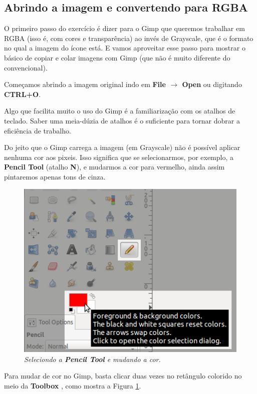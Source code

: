 \documentclass[12pt,onecolumn]{article}
\begin{document}
  \subsection{Abrindo a imagem e convertendo para RGBA}
    O primeiro passo do exercício é dizer para o Gimp que queremos trabalhar em
    RGBA (isso é, com cores e transparência) ao invés de Grayscale, que é o
    formato no qual a imagem do ícone está. E vamos aproveitar esse passo para
    mostrar o básico de copiar e colar imagens com Gimp (que não é muito
    diferente do convencional).
    
    Começamos abrindo a imagem original indo em {\bf File $\rightarrow$ Open}
    ou digitando {\bf CTRL+O}.
    
    \begin{framed}
      Algo que facilita muito o uso do Gimp é a familiarização com os atalhos
      de teclado. Saber uma meia-dúzia de atalhos é o suficiente para tornar
      dobrar a eficiência de trabalho. 
    \end{framed}
    
    Do jeito que o Gimp carrega a imagem (em Grayscale) não é possível aplicar
    nenhuma cor aos pixeis. Isso significa que se selecionarmos, por exemplo,
    a {\bf Pencil Tool} (atalho {\bf N}), e mudarmos a cor para vermelho, ainda
    assim pintaremos apenas tons de cinza.
    
    \begin{figure}[h]
      \centering
      \includegraphics[width=.6\textwidth]{screenshots/00-pencil_and_color.png}
      \caption{
        \footnotesize
        \it
        Seleciondo a {\bf Pencil Tool} e mudando a cor.
      }
      \label{fig:pencil_and_color}
    \end{figure}
    
    \begin{framed}
      Para mudar de cor no Gimp, basta clicar duas vezes no retângulo colorido
      no meio da {\bf Toolbox }, como mostra a Figura \ref{fig:pencil_and_color}.
    \end{framed}
    
\end{document}
